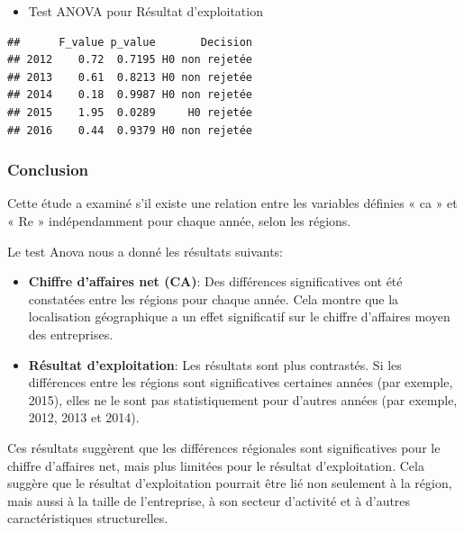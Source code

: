 \documentclass[mstat,12pt]{unswthesis}
\begin{document}
\bigskip

\begin{itemize}
\tightlist
\item
  Test ANOVA pour Résultat d'exploitation \medskip
\end{itemize}

\begin{verbatim}
##      F_value p_value       Decision
## 2012    0.72  0.7195 H0 non rejetée
## 2013    0.61  0.8213 H0 non rejetée
## 2014    0.18  0.9987 H0 non rejetée
## 2015    1.95  0.0289     H0 rejetée
## 2016    0.44  0.9379 H0 non rejetée
\end{verbatim}

\subsubsection{Conclusion}\label{conclusion-1}

Cette étude a examiné s'il existe une relation entre les variables
définies « ca » et « Re » indépendamment pour chaque année, selon les
régions.

Le test Anova nous a donné les résultats suivants:

\begin{itemize}
\tightlist
\item
  \textbf{Chiffre d'affaires net (CA)}: Des différences significatives
  ont été constatées entre les régions pour chaque année. Cela montre
  que la localisation géographique a un effet significatif sur le
  chiffre d'affaires moyen des entreprises.
\end{itemize}

\medskip

\begin{itemize}
\tightlist
\item
  \textbf{Résultat d'exploitation}: Les résultats sont plus contrastés.
  Si les différences entre les régions sont significatives certaines
  années (par exemple, 2015), elles ne le sont pas statistiquement pour
  d'autres années (par exemple, 2012, 2013 et 2014).
\end{itemize}

Ces résultats suggèrent que les différences régionales sont
significatives pour le chiffre d'affaires net, mais plus limitées pour
le résultat d'exploitation. Cela suggère que le résultat d'exploitation
pourrait être lié non seulement à la région, mais aussi à la taille de
l'entreprise, à son secteur d'activité et à d'autres caractéristiques
structurelles.
\end{document}
